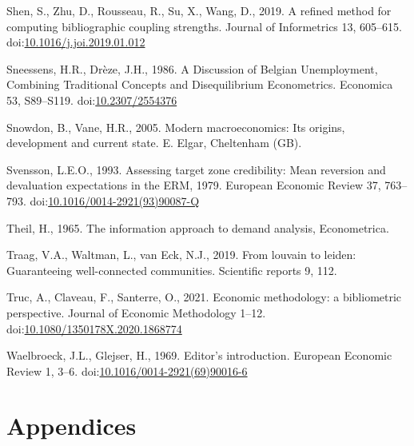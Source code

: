 \documentclass[
  12pt,
  onecolumn]{article}
\newlength{\cslhangindent}
\newlength{\cslentryspacingunit} %
\newenvironment{CSLReferences}[2] %
 {%
  \setlength{\parindent}{0pt}
  \ifodd #1
  \let\oldpar\par
  \def\par{\hangindent=\cslhangindent\oldpar}
  \fi
  \setlength{\parskip}{#2\cslentryspacingunit}
 }%
 {}
\begin{document}
\begin{CSLReferences}{1}{0}
\leavevmode{}%
Shen, S., Zhu, D., Rousseau, R., Su, X., Wang, D., 2019. A refined method for computing bibliographic coupling strengths. Journal of Informetrics 13, 605--615. doi:\href{https://doi.org/10.1016/j.joi.2019.01.012}{10.1016/j.joi.2019.01.012}

\leavevmode{}%
Sneessens, H.R., Drèze, J.H., 1986. A {Discussion} of {Belgian Unemployment}, {Combining Traditional Concepts} and {Disequilibrium Econometrics}. Economica 53, S89--S119. doi:\href{https://doi.org/10.2307/2554376}{10.2307/2554376}

\leavevmode{}%
Snowdon, B., Vane, H.R., 2005. Modern macroeconomics: Its origins, development and current state. {E. Elgar}, {Cheltenham (GB)}.

\leavevmode{}%
Svensson, L.E.O., 1993. Assessing target zone credibility: {Mean} reversion and devaluation expectations in the {ERM}, 1979. European Economic Review 37, 763--793. doi:\href{https://doi.org/10.1016/0014-2921(93)90087-Q}{10.1016/0014-2921(93)90087-Q}

\leavevmode{}%
Theil, H., 1965. The information approach to demand analysis, Econometrica.

\leavevmode{}%
Traag, V.A., Waltman, L., van Eck, N.J., 2019. From louvain to leiden: Guaranteeing well-connected communities. Scientific reports 9, 112.

\leavevmode{}%
Truc, A., Claveau, F., Santerre, O., 2021. Economic methodology: a bibliometric perspective. Journal of Economic Methodology 1--12. doi:\href{https://doi.org/10.1080/1350178X.2020.1868774}{10.1080/1350178X.2020.1868774}

\leavevmode{}%
Waelbroeck, J.L., Glejser, H., 1969. Editor's introduction. European Economic Review 1, 3--6. doi:\href{https://doi.org/10.1016/0014-2921(69)90016-6}{10.1016/0014-2921(69)90016-6}

\end{CSLReferences}

\newpage

\hypertarget{appendices}{%
\section*{Appendices}\label{appendices}}
\end{document}
